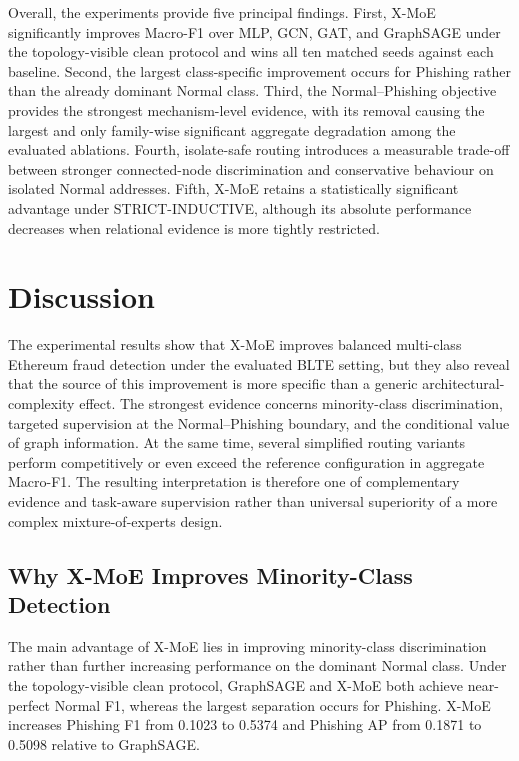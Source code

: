 \documentclass{ieeeaccess}
\begin{document}
Overall, the experiments provide five principal findings. First, X-MoE significantly improves Macro-F1 over MLP, GCN, GAT, and GraphSAGE under the topology-visible clean protocol and wins all ten matched seeds against each baseline. Second, the largest class-specific improvement occurs for Phishing rather than the already dominant Normal class. Third, the Normal--Phishing objective provides the strongest mechanism-level evidence, with its removal causing the largest and only family-wise significant aggregate degradation among the evaluated ablations. Fourth, isolate-safe routing introduces a measurable trade-off between stronger connected-node discrimination and conservative behaviour on isolated Normal addresses. Fifth, X-MoE retains a statistically significant advantage under STRICT-INDUCTIVE, although its absolute performance decreases when relational evidence is more tightly restricted.



\section{Discussion}

The experimental results show that X-MoE improves balanced multi-class Ethereum fraud detection under the evaluated BLTE setting, but they also reveal that the source of this improvement is more specific than a generic architectural-complexity effect. The strongest evidence concerns minority-class discrimination, targeted supervision at the Normal--Phishing boundary, and the conditional value of graph information. At the same time, several simplified routing variants perform competitively or even exceed the reference configuration in aggregate Macro-F1. The resulting interpretation is therefore one of complementary evidence and task-aware supervision rather than universal superiority of a more complex mixture-of-experts design.

\subsection{Why X-MoE Improves Minority-Class Detection}

The main advantage of X-MoE lies in improving minority-class discrimination rather than further increasing performance on the dominant Normal class. Under the topology-visible clean protocol, GraphSAGE and X-MoE both achieve near-perfect Normal F1, whereas the largest separation occurs for Phishing. X-MoE increases Phishing F1 from 0.1023 to 0.5374 and Phishing AP from 0.1871 to 0.5098 relative to GraphSAGE.
\end{document}
